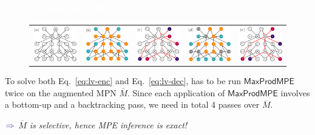 \documentclass[xcolor={usenames,dvipsnames,svgnames}, compress]{beamer}
\newcommand{\highlighttext}[2][yellow]{{\colorbox{#1}{\textcolor{white}{#2}}}}
\begin{document}
\begin{frame}[t]
    \frametitle{\highlighttext[bgrey1]{$\mathsf{CAT}$ embeddings (II)}}
    \footnotesize

    \begin{figure}[!ht]
      \vspace{-10pt}
  \raggedright
   \setlength{\tabcolsep}{3pt}
    \begin{tabular}{ccccc}
     \includegraphics[width=0.17\columnwidth]
     {figures/spn-mpe-aug-eval-i} \label{fig:spn-aug-eval-i}&
     \includegraphics[width=0.17\columnwidth]
     {figures/spn-mpe-aug-eval-ii} \label{fig:spn-aug-eval-ii}&
     \includegraphics[width=0.17\columnwidth]
     {figures/spn-mpe-aug-eval-iii} \label{fig:spn-aug-eval-iii}&
     \includegraphics[width=0.17\columnwidth]
     {figures/spn-mpe-aug-eval-iiii} \label{fig:spn-aug-eval-iiii}&
     \includegraphics[width=0.17\columnwidth]
     {figures/spn-mpe-aug-eval-v} \label{fig:spn-aug-eval-v}
    \end{tabular}
 \end{figure}

    To solve both Eq.~\eqref{eq:lv-enc} and Eq.~\eqref{eq:lv-dec}, 
has to be run
$\mathsf{MaxProdMPE}$ twice on the augmented MPN $\overline{M}$.
Since each application of $\mathsf{MaxProdMPE}$ involves a bottom-up and a backtracking pass, we need in total 4 passes over $\overline{M}$.
\begin{minipage}{1.0\linewidth}
      \raggedleft
      $\color{violet}\boldsymbol\Rightarrow$
      \scriptsize
     \emph{$\overline{M}$ is selective, hence MPE inference is exact!}
\end{minipage}\par\bigskip
    


\end{frame}
\end{document}

